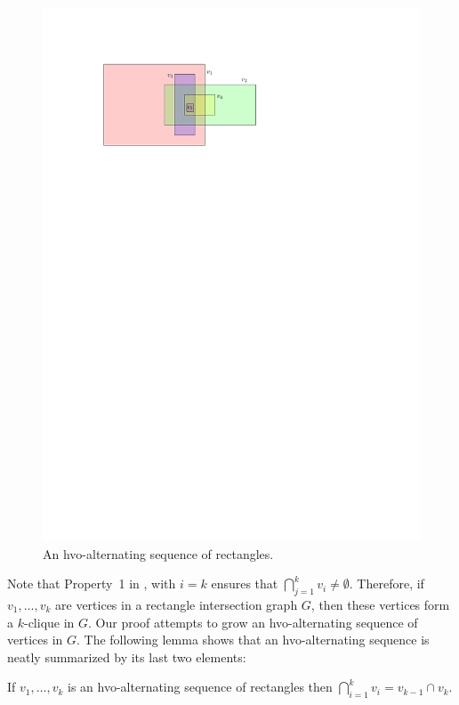 \documentclass[lotsofwhite]{patmorin}
\begin{document}
\begin{figure}
  \begin{center}
    \includegraphics{figs/good-sequence}
  \end{center}
  \caption{An hvo-alternating sequence of rectangles.}
\end{figure}

Note that Property~1 in , with $i=k$ ensures that
$\bigcap_{j=1}^k v_i\neq\emptyset$.  Therefore, if $v_1,\ldots,v_k$ are
vertices in a rectangle intersection graph $G$, then these vertices form a
$k$-clique in $G$.  Our proof attempts to grow an hvo-alternating sequence
of vertices in $G$. The following lemma shows that an hvo-alternating
sequence is neatly summarized by its last two elements:

\begin{lem}
  If $v_1,\ldots,v_k$ is an hvo-alternating sequence of
  rectangles then $\bigcap_{i=1}^{k} v_i = v_{k-1}\cap v_k$.
\end{lem}
\end{document}
